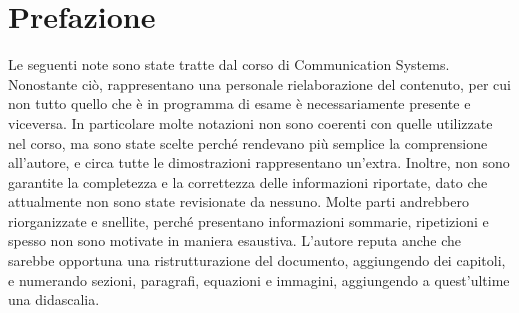 \section*{Prefazione}
Le seguenti note sono state tratte dal corso di Communication Systems. 
Nonostante ciò, rappresentano una personale rielaborazione del contenuto, per cui non tutto quello che è in programma di esame è necessariamente presente e viceversa.
In particolare molte notazioni non sono coerenti con quelle utilizzate nel corso, ma sono state scelte perché rendevano più semplice la comprensione all'autore, e circa tutte le dimostrazioni rappresentano un'extra.
Inoltre, non sono garantite la completezza e la correttezza delle informazioni riportate, dato che attualmente non sono state revisionate da nessuno. 
Molte parti andrebbero riorganizzate e snellite, perché presentano informazioni sommarie, ripetizioni e spesso non sono motivate in maniera esaustiva.
L'autore reputa anche che sarebbe opportuna una ristrutturazione del documento, aggiungendo dei capitoli, e numerando sezioni, paragrafi, equazioni e immagini, aggiungendo a quest'ultime una didascalia.
